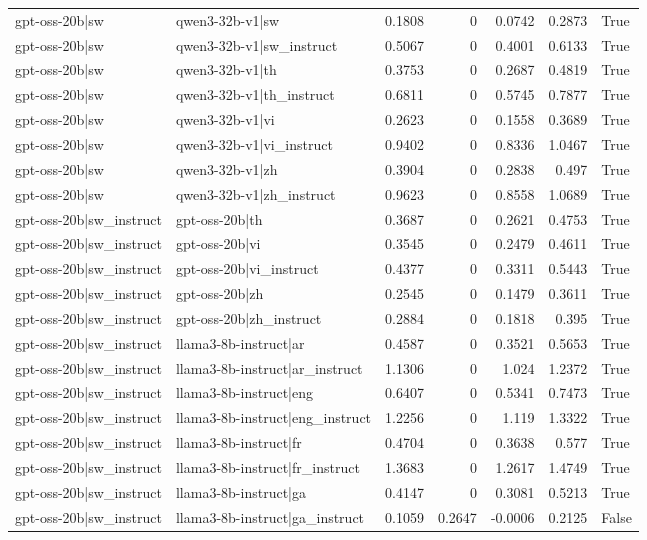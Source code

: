 \begin{table}
\begin{tabular}{l l r r r r l}
gpt-oss-20b|sw & qwen3-32b-v1|sw & 0.1808 & 0 & 0.0742 & 0.2873 & True \\
gpt-oss-20b|sw & qwen3-32b-v1|sw_instruct & 0.5067 & 0 & 0.4001 & 0.6133 & True \\
gpt-oss-20b|sw & qwen3-32b-v1|th & 0.3753 & 0 & 0.2687 & 0.4819 & True \\
gpt-oss-20b|sw & qwen3-32b-v1|th_instruct & 0.6811 & 0 & 0.5745 & 0.7877 & True \\
gpt-oss-20b|sw & qwen3-32b-v1|vi & 0.2623 & 0 & 0.1558 & 0.3689 & True \\
gpt-oss-20b|sw & qwen3-32b-v1|vi_instruct & 0.9402 & 0 & 0.8336 & 1.0467 & True \\
gpt-oss-20b|sw & qwen3-32b-v1|zh & 0.3904 & 0 & 0.2838 & 0.497 & True \\
gpt-oss-20b|sw & qwen3-32b-v1|zh_instruct & 0.9623 & 0 & 0.8558 & 1.0689 & True \\
gpt-oss-20b|sw_instruct & gpt-oss-20b|th & 0.3687 & 0 & 0.2621 & 0.4753 & True \\
gpt-oss-20b|sw_instruct & gpt-oss-20b|vi & 0.3545 & 0 & 0.2479 & 0.4611 & True \\
gpt-oss-20b|sw_instruct & gpt-oss-20b|vi_instruct & 0.4377 & 0 & 0.3311 & 0.5443 & True \\
gpt-oss-20b|sw_instruct & gpt-oss-20b|zh & 0.2545 & 0 & 0.1479 & 0.3611 & True \\
gpt-oss-20b|sw_instruct & gpt-oss-20b|zh_instruct & 0.2884 & 0 & 0.1818 & 0.395 & True \\
gpt-oss-20b|sw_instruct & llama3-8b-instruct|ar & 0.4587 & 0 & 0.3521 & 0.5653 & True \\
gpt-oss-20b|sw_instruct & llama3-8b-instruct|ar_instruct & 1.1306 & 0 & 1.024 & 1.2372 & True \\
gpt-oss-20b|sw_instruct & llama3-8b-instruct|eng & 0.6407 & 0 & 0.5341 & 0.7473 & True \\
gpt-oss-20b|sw_instruct & llama3-8b-instruct|eng_instruct & 1.2256 & 0 & 1.119 & 1.3322 & True \\
gpt-oss-20b|sw_instruct & llama3-8b-instruct|fr & 0.4704 & 0 & 0.3638 & 0.577 & True \\
gpt-oss-20b|sw_instruct & llama3-8b-instruct|fr_instruct & 1.3683 & 0 & 1.2617 & 1.4749 & True \\
gpt-oss-20b|sw_instruct & llama3-8b-instruct|ga & 0.4147 & 0 & 0.3081 & 0.5213 & True \\
gpt-oss-20b|sw_instruct & llama3-8b-instruct|ga_instruct & 0.1059 & 0.2647 & -0.0006 & 0.2125 & False \\

\end{tabular}
\end{table}

